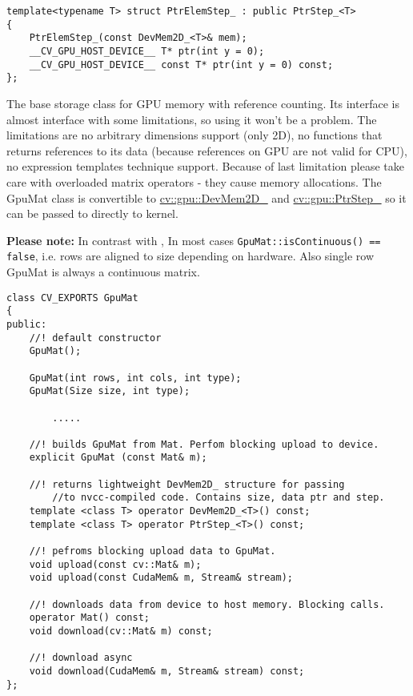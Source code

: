 \begin{lstlisting}
template<typename T> struct PtrElemStep_ : public PtrStep_<T>
{                   
	PtrElemStep_(const DevMem2D_<T>& mem);
	__CV_GPU_HOST_DEVICE__ T* ptr(int y = 0);
	__CV_GPU_HOST_DEVICE__ const T* ptr(int y = 0) const;
};
\end{lstlisting}



The base storage class for GPU memory with reference counting. Its interface is almost  interface with some limitations, so using it won't be a problem. The limitations are no arbitrary dimensions support (only 2D), no functions that returns references to its data (because references on GPU are not valid for CPU), no expression templates technique support. Because of last limitation please take care with overloaded matrix operators - they cause memory allocations. The GpuMat class is convertible to  \hyperref[cppfunc.gpu.DevMem2D]{cv::gpu::DevMem2D\_} and  \hyperref[cppfunc.gpu.PtrStep]{cv::gpu::PtrStep\_} so it can be passed to directly to kernel.




\textbf{Please note:} In contrast with , In most cases \texttt{GpuMat::isContinuous() == false}, i.e. rows are aligned to size depending on hardware. Also single row GpuMat is always a continuous matrix.

\begin{lstlisting}
class CV_EXPORTS GpuMat
{
public:
	//! default constructor
	GpuMat();

	GpuMat(int rows, int cols, int type);
	GpuMat(Size size, int type);

        .....

	//! builds GpuMat from Mat. Perfom blocking upload to device.
	explicit GpuMat (const Mat& m);

	//! returns lightweight DevMem2D_ structure for passing 
        //to nvcc-compiled code. Contains size, data ptr and step.
	template <class T> operator DevMem2D_<T>() const;
	template <class T> operator PtrStep_<T>() const;

	//! pefroms blocking upload data to GpuMat.
	void upload(const cv::Mat& m);
	void upload(const CudaMem& m, Stream& stream);

	//! downloads data from device to host memory. Blocking calls.
	operator Mat() const;
	void download(cv::Mat& m) const;

	//! download async
	void download(CudaMem& m, Stream& stream) const;
};
\end{lstlisting}


